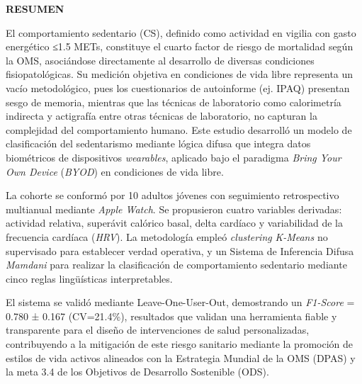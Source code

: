 \documentclass[12pt,letterpaper,oneside]{report}
\begin{document}
\newpage
{}  %
\setcounter{page}{1}
\thispagestyle{empty}

{\centering
{\fontsize{14}{16}\selectfont\bfseries RESUMEN}\\[1cm]
}

\setlength{\parindent}{1.27cm}
\onehalfspacing
\setlength{\parskip}{6pt plus 2pt minus 1pt}

\noindent El comportamiento sedentario (CS), definido como actividad en vigilia con gasto energético ≤1.5 METs, constituye el cuarto factor de riesgo de mortalidad según la OMS, asociándose directamente al desarrollo de diversas condiciones fisiopatológicas. Su medición objetiva en condiciones de vida libre representa un vacío metodológico, pues los cuestionarios de autoinforme (ej. IPAQ) presentan sesgo de memoria, mientras que las técnicas de laboratorio como calorimetría indirecta y actigrafía entre otras técnicas de laboratorio, no capturan la complejidad del comportamiento humano. Este estudio desarrolló un modelo de clasificación del sedentarismo mediante lógica difusa que integra datos biométricos de dispositivos \textit{wearables}, aplicado bajo el paradigma \textit{Bring Your Own Device} (\textit{BYOD}) en condiciones de vida libre.

La cohorte se conformó por 10 adultos jóvenes con seguimiento retrospectivo multianual mediante \textit{Apple Watch}. Se propusieron cuatro variables derivadas: actividad relativa, superávit calórico basal, delta cardíaco y variabilidad de la frecuencia cardíaca (\textit{HRV}). La metodología empleó \textit{clustering} \textit{K-Means} no supervisado para establecer verdad operativa, y un Sistema de Inferencia Difusa \textit{Mamdani} para realizar la clasificación de comportamiento sedentario mediante cinco reglas lingüísticas interpretables.

El sistema se validó mediante Leave-One-User-Out, demostrando un \textit{F1-Score} = 0.780 ± 0.167 (CV=21.4\%), resultados que validan una herramienta fiable y transparente para el diseño de intervenciones de salud personalizadas, contribuyendo a la mitigación de este riesgo sanitario mediante la promoción de estilos de vida activos alineados con la Estrategia Mundial de la OMS (DPAS) y la meta 3.4 de los Objetivos de Desarrollo Sostenible (ODS).
\end{document}
